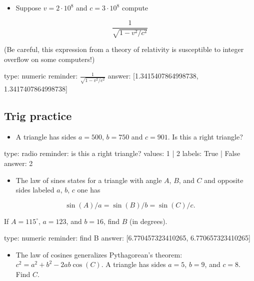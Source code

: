 \documentclass[12pt]{article}
\begin{document}
\begin{itemize}
\itemsep1pt\parskip0pt
\item
  Suppose $v = 2\cdot 10^8$ and $c = 3 \cdot 10^8$ compute
\end{itemize}

\[
\frac{1}{\sqrt{1 - v^2/c^2}}
\]

(Be careful, this expression from a theory of relativity is susceptible
to integer overflow on some computers!)

\begin{answer}
    type: numeric
    reminder: \( \frac{1}{\sqrt{1 - v^2/c^2}} \)
    answer: [1.3415407864998738, 1.3417407864998738]

\end{answer}

\subsection{Trig practice}

\begin{itemize}
\itemsep1pt\parskip0pt
\item
  A triangle has sides $a=500$, $b=750$ and $c=901$. Is this a right
  triangle?
\end{itemize}

\begin{answer}
type: radio
reminder: is this a right triangle?
values: 1 | 2
labels: True | False
answer: 2
\end{answer}

\begin{itemize}
\itemsep1pt\parskip0pt
\item
  The law of sines states for a triangle with angle $A$, $B$, and $C$
  and opposite sides labeled $a$, $b$, $c$ one has
\end{itemize}

\[ 
\sin(A)/a = \sin(B)/b = \sin(C)/c.
\]

If $A=115^\circ$, $a=123$, and $b=16$, find $B$ (in degrees).

\begin{answer}
    type: numeric
    reminder: find B
    answer: [6.770457323410265, 6.770657323410265]

\end{answer}

\begin{itemize}
\itemsep1pt\parskip0pt
\item
  The law of cosines generalizes Pythagorean's theorem:
  $c^2 = a^2 +   b^2 - 2ab \cos(C)$. A triangle has sides $a=5$, $b=9$,
  and $c=8$. Find $C$.
\end{itemize}
\end{document}
